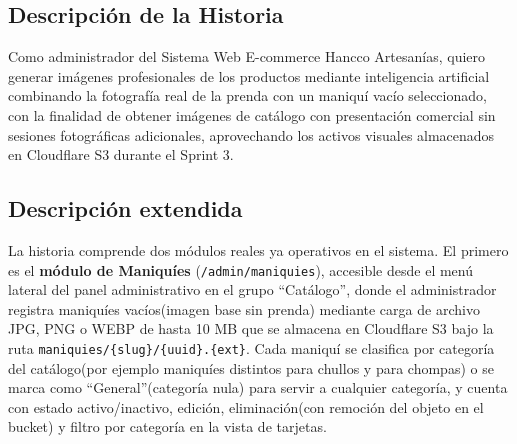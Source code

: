 \documentclass[12pt,a4paper]{article}
\begin{document}
\subsection*{Descripción de la Historia}

Como administrador del Sistema Web E-commerce Hancco Artesanías, quiero generar imágenes profesionales de los productos mediante inteligencia artificial combinando la fotografía real de la prenda con un maniquí vacío seleccionado, con la finalidad de obtener imágenes de catálogo con presentación comercial sin sesiones fotográficas adicionales, aprovechando los activos visuales almacenados en Cloudflare S3 durante el Sprint 3.

\subsection*{Descripción extendida}

La historia comprende dos módulos reales ya operativos en el sistema. El primero es el \textbf{módulo de Maniquíes} (\texttt{/admin/maniquies}), accesible desde el menú lateral del panel administrativo en el grupo ``Catálogo'', donde el administrador registra maniquíes vacíos(imagen base sin prenda) mediante carga de archivo JPG, PNG o WEBP de hasta 10 MB que se almacena en Cloudflare S3 bajo la ruta \texttt{maniquies/\{slug\}/\{uuid\}.\{ext\}}. Cada maniquí se clasifica por categoría del catálogo(por ejemplo maniquíes distintos para chullos y para chompas) o se marca como ``General''(categoría nula) para servir a cualquier categoría, y cuenta con estado activo/inactivo, edición, eliminación(con remoción del objeto en el bucket) y filtro por categoría en la vista de tarjetas.
\end{document}
